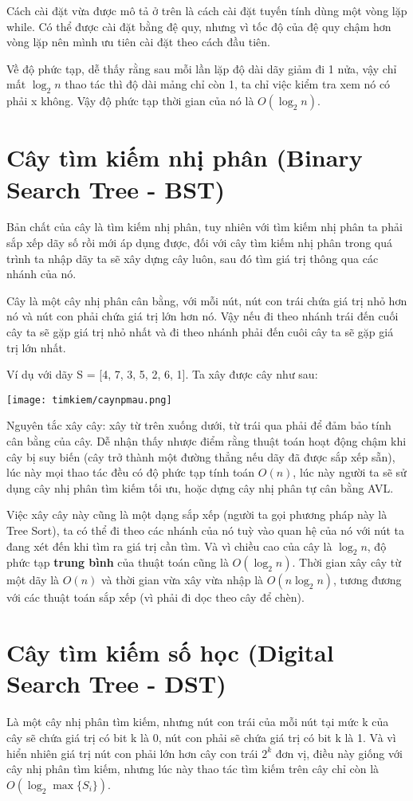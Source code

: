 Cách cài đặt vừa được mô tả ở trên là cách cài đặt tuyến tính dùng một vòng lặp while. Có thể được cài đặt bằng đệ quy, nhưng vì tốc độ của đệ quy chậm hơn vòng lặp nên mình ưu tiên cài đặt theo cách đầu tiên.

Về độ phức tạp, dễ thấy rằng sau mỗi lần lặp độ dài dãy giảm đi 1 nửa, vậy chỉ mất $\log_2n$ thao tác thì độ dài mảng chỉ còn 1, ta chỉ việc kiểm tra xem nó có phải x không. Vậy độ phức tạp thời gian của nó là $O(\log_2n)$.

\section{Cây tìm kiếm nhị phân (Binary Search Tree - BST)}
Bản chất của cây là tìm kiếm nhị phân, tuy nhiên với tìm kiếm nhị phân ta phải sắp xếp dãy số rồi mới áp dụng được, đối với cây tìm kiếm nhị phân trong quá trình ta nhập dãy ta sẽ xây dựng cây luôn, sau đó tìm giá trị thông qua các nhánh của nó.

Cây là một cây nhị phân cân bằng, với mỗi nút, nút con trái chứa giá trị nhỏ hơn nó và nút con phải chứa giá trị lớn hơn nó. Vậy nếu đi theo nhánh trái đến cuối cây ta sẽ gặp giá trị nhỏ nhất và đi theo nhánh phải đến cuôi cây ta sẽ gặp giá trị lớn nhất.

Ví dụ với dãy S = [4, 7, 3, 5, 2, 6, 1]. Ta xây được cây như sau:

\texttt{[image: timkiem/caynpmau.png]}

Nguyên tắc xây cây: xây từ trên xuống dưới, từ trái qua phải để đảm bảo tính cân bằng của cây. Dễ nhận thấy nhược điểm rằng thuật toán hoạt động chậm khi cây bị suy biến (cây trở thành một đường thẳng nếu dãy đã được sắp xếp sẵn), lúc này mọi thao tác đều có độ phức tạp tính toán $O(n)$, lúc này người ta sẽ sử dụng cây nhị phân tìm kiếm tối ưu, hoặc dựng cây nhị phân tự cân bằng AVL.

Việc xây cây này cũng là một dạng sắp xếp (người ta gọi phương pháp này là Tree Sort), ta có thể đi theo các nhánh của nó tuỳ vào quan hệ của nó với nút ta đang xét đến khi tìm ra giá trị cần tìm. Và vì chiều cao của cây là $\log_2n$, độ phức tạp \textbf{trung bình} của thuật toán cũng là $O(\log_2n)$. Thời gian xây cây từ một dãy là $O(n)$ và thời gian vừa xây vừa nhập là $O(n\log_2n)$, tương đương với các thuật toán sắp xếp (vì phải đi dọc theo cây để chèn).

\section{Cây tìm kiếm số học (Digital Search Tree - DST)}
Là một cây nhị phân tìm kiếm, nhưng nút con trái của mỗi nút tại mức k của cây sẽ chứa giá trị có bit k là 0, nút con phải sẽ chứa giá trị có bit k là 1. Và vì hiển nhiên giá trị nút con phải lớn hơn cây con trái $2^k$ đơn vị, điều này giống với cây nhị phân tìm kiếm, nhưng lúc này thao tác tìm kiếm trên cây chỉ còn là $O(\log_2\max\{S_i\})$.

